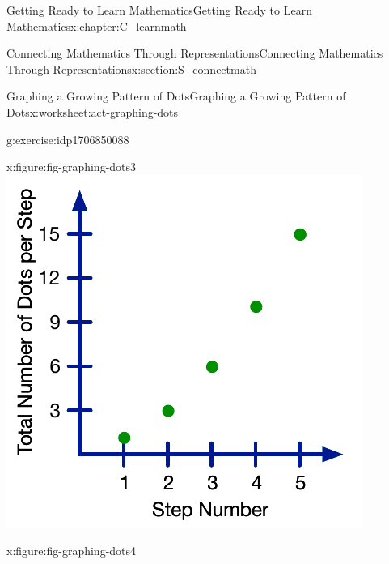 \documentclass[oneside,10pt,]{book}
\numberwithin{equation}{chapter}
\begin{document}
\begin{chapterptx}{Getting Ready to Learn Mathematics}{}{Getting Ready to Learn Mathematics}{}{}{x:chapter:C_learnmath}
\begin{sectionptx}{Connecting Mathematics Through Representations}{}{Connecting Mathematics Through Representations}{}{}{x:section:S_connectmath}
\begin{worksheet-subsection}{Graphing a Growing Pattern of Dots}{}{Graphing a Growing Pattern of Dots}{}{}{x:worksheet:act-graphing-dots}
\begin{divisionexercise}{1}{}{}{g:exercise:idp1706850088}
\begin{sidebyside}{4}{0}{0}{0}
\begin{sbspanel}{0.25}
\begin{figureptx}{}{x:figure:fig-graphing-dots3}{}
\includegraphics[width=\linewidth]{external/graphing-dots3.pdf}
\tcblower
\end{figureptx}%
\end{sbspanel}%
\begin{sbspanel}{0.25}%
\begin{figureptx}{}{x:figure:fig-graphing-dots4}{}%

\end{figureptx}
\end{sbspanel}
\end{sidebyside}
\end{divisionexercise}
\end{worksheet-subsection}
\end{sectionptx}
\end{chapterptx}
\end{document}

